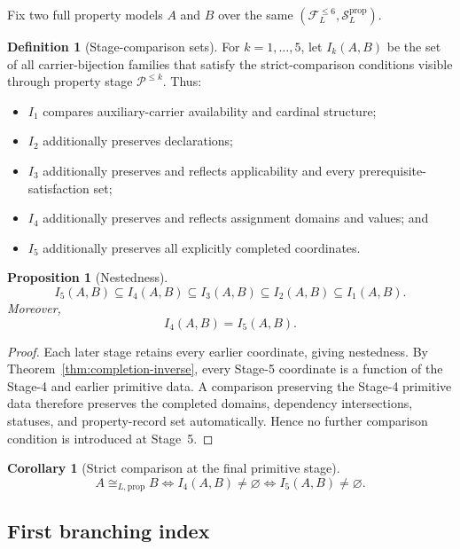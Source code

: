 \documentclass[11pt]{article}
\newcommand{\FVI}{\mathcal F_{L}^{\le 6}}
\newcommand{\Sprop}{\mathcal S_{L}^{\mathrm{prop}}}
\newtheorem{proposition}[theorem]{Proposition}
\newtheorem{corollary}[theorem]{Corollary}
\theoremstyle{definition}
\newtheorem{definition}[theorem]{Definition}
\theoremstyle{remark}
\begin{document}
Fix two full property models \(A\) and \(B\) over the same \((\FVI,\Sprop)\).

\begin{definition}[Stage-comparison sets]
For \(k=1,\ldots,5\), let \(I_k(A,B)\) be the set of all carrier-bijection families that satisfy the strict-comparison conditions visible through property stage \(\mathcal P^{\le k}\).
Thus:
\begin{itemize}
\item \(I_1\) compares auxiliary-carrier availability and cardinal structure;
\item \(I_2\) additionally preserves declarations;
\item \(I_3\) additionally preserves and reflects applicability and every prerequisite-satisfaction set;
\item \(I_4\) additionally preserves and reflects assignment domains and values; and
\item \(I_5\) additionally preserves all explicitly completed coordinates.
\end{itemize}
\end{definition}

\begin{proposition}[Nestedness]
\[
I_5(A,B)\subseteq I_4(A,B)\subseteq I_3(A,B)\subseteq I_2(A,B)\subseteq I_1(A,B).
\]
Moreover,
\[
I_4(A,B)=I_5(A,B).
\]
\end{proposition}

\begin{proof}
Each later stage retains every earlier coordinate, giving nestedness.
By Theorem~\ref{thm:completion-inverse}, every Stage-5 coordinate is a function of the Stage-4 and earlier primitive data.
A comparison preserving the Stage-4 primitive data therefore preserves the completed domains, dependency intersections, statuses, and property-record set automatically.
Hence no further comparison condition is introduced at Stage~5.
\end{proof}

\begin{corollary}[Strict comparison at the final primitive stage]
\[
A\cong_{L,\mathrm{prop}}B
\Longleftrightarrow
I_4(A,B)\neq\varnothing
\Longleftrightarrow
I_5(A,B)\neq\varnothing.
\]
\end{corollary}

\subsection{First branching index}
\end{document}
